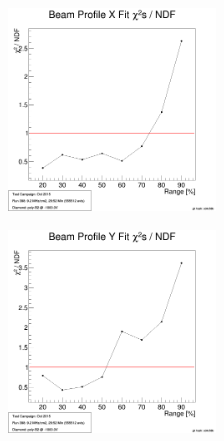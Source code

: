 \documentclass[9pt]{beamer}
\begin{document}
\begin{frame}
	\begin{center}
		\begin{minipage}{5.5cm}
			\centering
			\includegraphics[width=5.5cm]{BeamProfChi2sX}
		\end{minipage}
		\hspace*{2pt}
		\begin{minipage}{5.5cm}
			\centering
			\includegraphics[width=5.5cm]{BeamProfChi2sY}
		\end{minipage}\no\s
	\end{center}
\end{frame}
\end{document}
